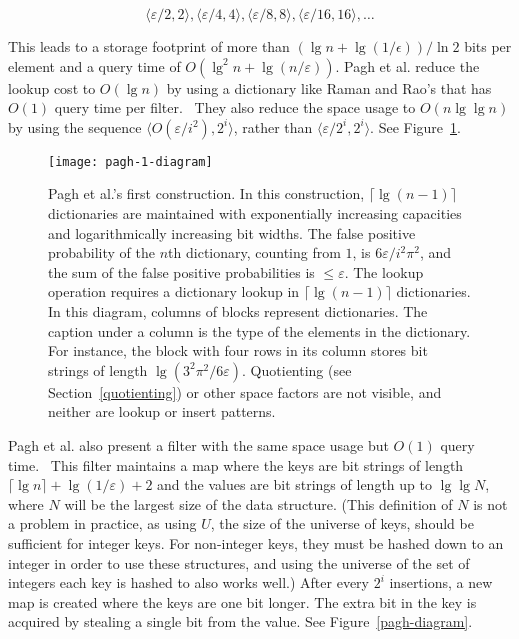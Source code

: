 \documentclass[sigconf, nonacm]{acmart}
\newcommand{\etal}{et al.}
\begin{document}
\[
\langle \varepsilon / 2, 2 \rangle,
 \langle \varepsilon / 4, 4 \rangle,
 \langle \varepsilon / 8, 8 \rangle,
 \langle \varepsilon / 16, 16 \rangle,
 \ldots
\]

This leads to a storage footprint of more than $(\lg n + \lg (1/\epsilon)) / \ln 2$ bits per element and a query time of $O(\lg^2 n + \lg (n/\varepsilon))$.
Pagh \etal{} reduce the lookup cost to $O(\lg n)$ by using a dictionary like Raman and Rao's that has $O(1)$ query time per filter.~\cite{psw,succinct}
They also reduce the space usage to $O(n \lg \lg n)$ by using the sequence $\langle O(\varepsilon / i^2),  2^i \rangle$, rather than  $\langle \varepsilon / 2^i,  2^i \rangle$.
See Figure~\ref{pagh-1-diagram}.

\begin{figure}
\texttt{[image: pagh-1-diagram]}
\caption{\label{pagh-1-diagram}
Pagh \etal{}'s first construction.
In this construction, $\lceil\lg (n-1) \rceil$ dictionaries are maintained with exponentially increasing capacities and logarithmically increasing bit widths.
The false positive probability of the $n$th dictionary, counting from $1$, is $6 \varepsilon / i^2 \pi^2$, and the sum of the false positive probabilities is $\le \varepsilon$.
The lookup operation requires a dictionary lookup in $\lceil\lg(n-1)\rceil$ dictionaries.\\
In this diagram, columns of blocks represent dictionaries.
The caption under a column is the type of the elements in the dictionary. For instance, the block with four rows in its column stores bit strings of length $\lg (3^2 \pi^2 / 6 \varepsilon)$.
Quotienting (see Section~\ref{quotienting}) or other space factors are not visible, and neither are lookup or insert patterns.
}
\end{figure}

Pagh \etal{} also present a filter with the same space usage but $O(1)$ query time.~\cite{psw}
This filter maintains a map where the keys are bit strings of length $\lceil \lg n \rceil + \lg (1/\varepsilon) + 2$ and the values are bit strings of length up to $\lg \lg N$, where $N$ will be the largest size of the data structure.
(This definition of $N$ is not a problem in practice, as using $U$, the size of the universe of keys, should be sufficient for integer keys. For non-integer keys, they must be hashed down to an integer in order to use these structures, and using the universe of the set of integers each key is hashed to also works well.)
After every $2^i$ insertions, a new map is created where the keys are one bit longer.
The extra bit in the key is acquired by stealing a single bit from the value.
See Figure~\ref{pagh-diagram}.
\end{document}
